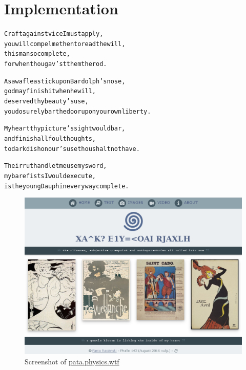 
\chapter{Implementation}
\label{ch:implementation}

\startcontents[chapters]

\vfill

\begin{alltt}\sffamily
Craft against vice I must apply,
you will compel me then to read the will,
this man so complete,
for when thou gav'st them the rod.

A saw a flea stick upon Bardolph's nose,
god may finish it when he will,
deserved thy beauty's use,
you do surely bar the door upon your own liberty.

My heart thy picture's sight would bar,
and finish all foul thoughts,
to dark dishonour's use thou shalt not have.

Their ruth and let me use my sword,
my bare fists I would execute,
is the young Dauphin every way complete.
\end{alltt}

\newpage
\minicontents
\spirals

\begin{figure}[!htbp] %
  \centering
  \includegraphics[width=\linewidth]{images/fullscreenshot}
\caption[Screenshot of \url{pata.physics.wtf}]{Screenshot of \url{pata.physics.wtf}}
\label{img:fullscreenshot}
\end{figure}

